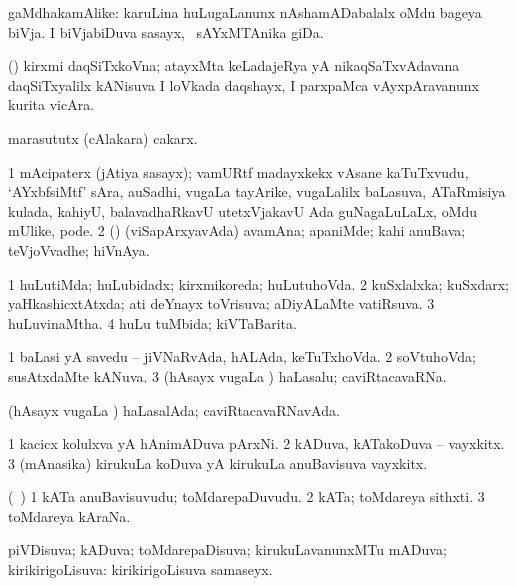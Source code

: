 \bentry
{} 
\gl{\nA}
\expl{}
\bmng
gaMdhakamAlike: 
\banum
{} karuLina huLugaLanunx nAshamADabalalx oMdu bageya biVja. 
 I biVjabiDuva sasayx, \kanmu\ sAYxMTAnika giDa. 
\eanum
\emng
\eentry

\bentry
{} 
\gl{\nA}
\expl{}
\bmng
(\hA) kirxmi daqSiTxkoVna; atayxMta keLadajeRya yA nikaqSaTxvAdavana daqSiTxyalilx kANisuva I loVkada daqshayx, I parxpaMca vAyxpAravanunx kurita vicAra. 
\emng
\eentry

\bentry
{} 
\gl{\nA}
\expl{}
\bmng
marasututx (cAlakara) cakarx. 
\emng
\eentry

\bentry
{} 
\gl{\nA}
\expl{}
\bmng
\bnum
\num{1} mAcipaterx (jAtiya sasayx); vamURtf madayxkekx vAsane kaTuTxvudu, `AYxbfsiMtf' sAra, auSadhi, \mo vugaLa tayArike, \mo vugaLalilx baLasuva, ATaRmisiya kulada, kahiyU, balavadhaRkavU utetxVjakavU Ada guNagaLuLaLx, oMdu mUlike, pode. 
\num{2} (\rUpa) (viSapArxyavAda) avamAna; apaniMde; kahi anuBava; teVjoVvadhe; hiVnAya. 
\enum
\emng
\eentry

\bentry
{} 
\gl{\gu}
\bmng
\bnum
\num{1} huLutiMda; huLubidadx; kirxmikoreda; huLutuhoVda. 
\num{2} kuSxlalxka; kuSxdarx; yaHkashicxtAtxda; ati deYnayx toVrisuva; aDiyALaMte vatiRsuva. 
\num{3} huLuvinaMtha. 
\num{4} huLu tuMbida; kiVTaBarita. 
\enum
\emng
\eentry

\bentry
{} 
\gl{\gu}
\expl{}
\bmng
\bnum
\num{1} baLasi yA savedu -- jiVNaRvAda, hALAda, keTuTxhoVda. 
\num{2} soVtuhoVda; susAtxdaMte kANuva. 
\num{3} (hAsayx \mo vugaLa \vi) haLasalu; caviRtacavaRNa. 
\enum
\emng

\noindent
\gl{\pagu}
\expl{}
\bmng
{} (hAsayx \mo vugaLa \vi) haLasalAda; caviRtacavaRNavAda. 
\emng
\eentry

\bentry
{} 
\gl{\nA}
\expl{}
\bmng
\bnum
\num{1} kacicx kolulxva yA hAnimADuva pArxNi. 
\num{2} kADuva, kATakoDuva -- vayxkitx. 
\num{3} (mAnasika) kirukuLa koDuva yA kirukuLa anuBavisuva vayxkitx. 
\enum
\emng
\eentry

\bentry
{} 
\gl{\nA}
\expl{}
\bmng
(\kanmu\ \ame) 
\bnum
\num{1} kATa anuBavisuvudu; toMdarepaDuvudu. 
\num{2} kATa; toMdareya sithxti. 
\num{3} toMdareya kAraNa. 
\enum
\emng
\eentry

\bentry
{} 
\gl{\gu}
\expl{}
\bmng
piVDisuva; kADuva; toMdarepaDisuva; kirukuLavanunxMTu mADuva; kirikirigoLisuva:  kirikirigoLisuva samaseyx. 
\emng
\eentry


